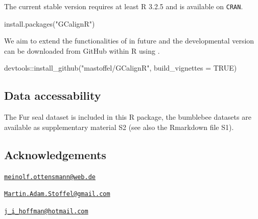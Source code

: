The current stable version requires at least R 3.2.5 and is available on
\texttt{CRAN}.

\begin{Schunk}
\begin{Sinput}
install.packages("GCalignR")
\end{Sinput}
\end{Schunk}

We aim to extend the functionalities of  in future and the
developmental version can be downloaded from GitHub within R using
\href{https://cran.r-project.org/web/packages/devtools/index.html}{}
\citep{Wickham.2016}.

\begin{Schunk}
\begin{Sinput}
devtools::install_github("mastoffel/GCalignR", build_vignettes = TRUE)
\end{Sinput}
\end{Schunk}

\subsection{Data accessability}\label{data-accessability}

The Fur seal dataset is included in this R package, the bumblebee
datasets are available as supplementary material S2 (see also the
Rmarkdown file S1).

\subsection{Acknowledgements}\label{acknowledgements}



\address{%
Meinolf Ottensmann\\
Department of Animal Behaviour\\
Bielefeld University\\ Morgenbreede 45\\ 33615 Bielefeld\\
}
\href{mailto:meinolf.ottensmann@web.de}{\nolinkurl{meinolf.ottensmann@web.de}}

\address{%
Martin A. Stoffel\\
Department of Animal Behaviour\\
Bielefeld University\\ Morgenbreede 45\\ 33615 Bielefeld\\
}
\href{mailto:Martin.Adam.Stoffel@gmail.com}{\nolinkurl{Martin.Adam.Stoffel@gmail.com}}

\address{%
Joseph I. Hoffman\\
Department of Animal Behaviour\\
Bielefeld University\\ Morgenbreede 45\\ 33615 Bielefeld\\
}
\href{mailto:j_i_hoffman@hotmail.com}{\nolinkurl{j\_i\_hoffman@hotmail.com}}


